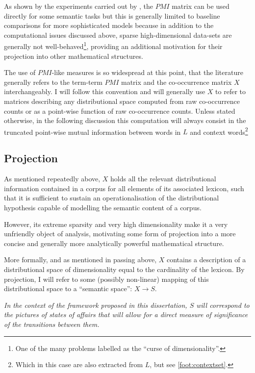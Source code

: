 As shown by the experiments carried out by \citeauthor{levy2014}, the $PMI$ matrix can be used directly for some semantic tasks but this is generally limited to baseline comparisons for more sophisticated models because in addition to the computational issues discussed above, sparse high-dimensional data-sets are generally not well-behaved\footnote{
    One of the many problems labelled as the ``curse of dimensionality''.
}, providing an additional motivation for their projection into other mathematical structures.

The use of $PMI$-like measures is so widespread at this point, that the literature generally refers to the term-term $PMI$ matrix and the co-occurrence matrix $X$ interchangeably.
I will follow this convention and will generally use $X$ to refer to matrices describing any distributional space computed from raw co-occurrence counts or as a point-wise function of raw co-occurrence counts.
Unless stated otherwise, in the following discussion this computation will always consist in the truncated point-wise mutual information between words in $L$ and context words\footnote{
    Which in this case are also extracted from $L$, but see \autoref{foot:contextset}.
}

\subsection{Projection}
\label{subsec:proj}

As mentioned repeatedly above, $X$ holds all the relevant distributional information contained in a corpus for all elements of its associated lexicon, such that it is sufficient to sustain an operationalisation of the distributional hypothesis capable of modelling the semantic content of a corpus.

However, its extreme sparsity and very high dimensionality make it a very unfriendly object of analysis, motivating some form of projection into a more concise and generally more analytically powerful mathematical structure.

More formally, and as mentioned in passing above, $X$ contains a description of a distributional space of dimensionality equal to the cardinality of the lexicon.
By projection, I will refer to some (possibly non-linear) mapping of this distributional space to a ``semantic space'': $X \rightarrow S$.

\emph{
    In the context of the framework proposed in this dissertation, $S$ will correspond to the pictures of states of affairs that will allow for a direct measure of significance of the transitions between them.
}

